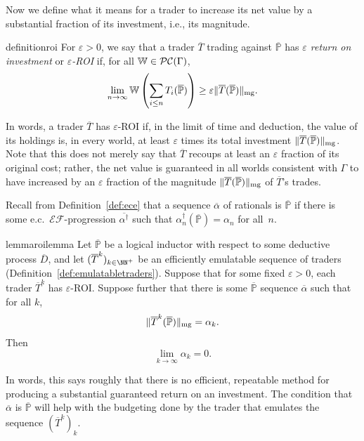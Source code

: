\documentclass[authordate,onecolumn,noenvironments]{miri-tech-article}
\numberwithin{equation}{subsection}
\newcommand{\seq}[1]{{\overline{#1}}}
\newcommand{\nn}{n}
\newcommand{\ec}[1][\ ]{e.c.#1}
\newcommand{\pgenable}{\ensuremath{\MP}\text{-generable}\xspace}
\newcommand{\li}{logical inductor}
\newcommand{\exfeatures}{\mathcal{E\!F}} %
\newcommand{\trade}{T}%
\newcommand{\Trader}{\seq{\trade}} %
\newcommand{\gens}{\dagger}
\newcommand{\gen}[1]{{#1^\gens}}
\newcommand{\magnit}[1]{{\|#1\|_{\rm mg}}} %
\newcommand{\BelState}{\mathbb{P}}
\newcommand{\pt}{\BelState}
\newcommand{\MP}{\seq{\pt}}
\newcommand{\ftn}{(\MP)} %
\newcommand{\dt}{D}
\newcommand{\DP}{\seq{\dt}}
\newcommand{\cworlds}{\mathcal{P\-C}} %
\newcommand{\World}{\mathbb{W}}
\newcommand{\Theory}{\Gamma}
\begin{document}


Now we define what it means for a trader to increase its net value by a substantial fraction of its investment, i.e., its magnitude. 
%
\begin{restatable}{definition}{roi} 
\label{def:roi}
For $\varepsilon>0$, we say that a trader $\Trader$ trading against $\MP$ has \emph{$\varepsilon$ return on investment} or \emph{$\varepsilon$-ROI} if, for all $\World \in \cworlds(\Theory)$,
%
\[ \lim_{n \to \infty} \World \left(\sum_{i \leq n} T_i \ftn \right) \geq \varepsilon \magnit{\Trader(\MP)}. \]
%
\end{restatable}
%
In words, a trader $\Trader$ has $\varepsilon$-ROI if, in the limit of time and deduction, the value of its holdings is, in every world,  at least $\varepsilon$
times its total  investment $\magnit{\Trader(\MP)}$. Note that this does not merely say that $\Trader$ recoups at least an $\varepsilon$ fraction of its original
cost; rather, the net value is guaranteed in all worlds consistent with $\Theory$
to have increased by an $\varepsilon$ fraction of the magnitude  $\magnit{\Trader(\MP)}$ of $\Trader$'s trades.  



Recall from Definition~\ref{def:ece} that a sequence $\seq\alpha$ of rationals is \pgenable if there is some \ec $\exfeatures$-progression $\seq{\gen \alpha}$ such that $\gen{\alpha_\nn} \ftn = \alpha_\nn$ for all~$\nn$.

\begin{restatable}{lemma}{roilemma} 
\label{lem:type3}
Let $\MP$ be a \li{} with respect to some deductive process $\DP$, and let $(\Trader^k)_{k\in\NN^+}$ be an efficiently emulatable sequence of traders (Definition~\ref{def:emulatabletraders}).
  Suppose that for some fixed $\varepsilon>0$, each trader $\Trader^k$ has $\varepsilon$-ROI\@. Suppose further that there is some
  \pgenable sequence $\seq\alpha$ 
  such that for all $k$,
%
  \[ \magnit{\Trader^k \ftn } = \alpha_k. \]
%
  Then \[ \lim_{k \rightarrow \infty} \alpha_k = 0. \]
\end{restatable}
%
In words, this says roughly that there is no efficient, repeatable method for producing a substantial guaranteed return on an investment. 
The condition that $\seq\alpha$ is \pgenable will help with the budgeting done by the trader that emulates 
the sequence $(\Trader^k)_k$.
\end{document}
